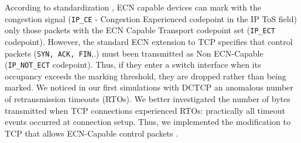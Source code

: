 According to standardization \cite{ipecn}, ECN capable devices can mark with the congestion signal (\texttt{IP\_CE} - Congestion Experienced codepoint in the IP ToS field) only those packets with the  ECN Capable Transport codepoint set (\texttt{IP\_ECT} codepoint). However, the standard ECN extension to TCP specifies that control packets (\texttt{SYN, ACK, FIN},.) must been transmitted as Non ECN-Capable (\texttt{IP\_NOT\_ECT} codepoint). Thus, if they enter a switch interface when its occupancy exceeds the marking threshold, they are dropped rather than being marked. We noticed in our first simulations with DCTCP an anomalous number of retransmission timeouts (RTOs). We better investigated the number of bytes transmitted when TCP connections experienced RTOs: practically all timeout events occurred at connection setup. Thus, we implemented the modification to TCP that allows ECN-Capable control packets \cite{synecn}.
